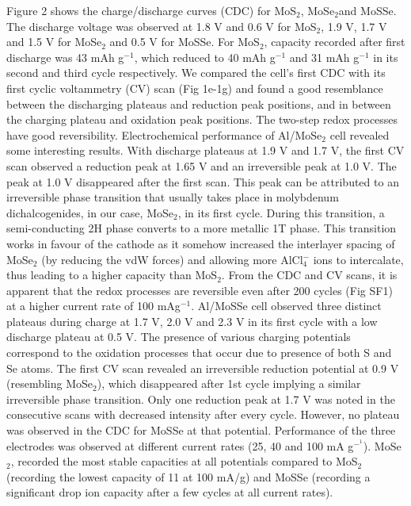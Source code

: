 \documentclass[num-refs]{wiley-article}
\begin{document}
Figure 2 shows the charge/discharge curves (CDC) for MoS$_2$, MoSe$_2$and MoSSe. The discharge voltage was observed at 1.8 V and 0.6 V  for MoS$_2$, 1.9 V, 1.7 V  and 1.5 V for MoSe$_2$ and 0.5 V for MoSSe. For MoS$_2$, capacity recorded after first discharge was 43 mAh g$^{-1}$, which reduced to 40 mAh g$^{-1}$ and 31 mAh g$^{-1}$ in its second and third cycle respectively. We compared the cell's first CDC with its first cyclic voltammetry (CV) scan (Fig 1e-1g) and found a good resemblance between the discharging plateaus and reduction peak positions, and in between the charging plateau and oxidation peak positions. The two-step redox processes have good reversibility. Electrochemical performance of Al/MoSe$_2$ cell revealed some interesting results. With discharge plateaus at 1.9 V and 1.7 V, the first CV scan observed a reduction peak at 1.65 V and an irreversible peak at 1.0 V. The peak at 1.0 V disappeared after the first scan. This peak can be attributed to an irreversible phase transition that usually takes place in molybdenum dichalcogenides, in our case, MoSe$_2$, in its first cycle\cite{fan_hybrid_2017}. During this transition, a semi-conducting 2H phase converts to a more metallic 1T phase.  This transition works in favour of the cathode as it somehow increased the interlayer spacing of MoSe$_2$ (by reducing the vdW forces) and allowing more AlCl$_4^-$ ions to intercalate, thus leading to a higher capacity than MoS$_2$. From the CDC and CV scans, it is apparent that the redox processes are reversible even after 200 cycles (Fig SF1) at a higher current rate of 100 mAg$^{-1}$. Al/MoSSe cell observed three distinct plateaus during charge at 1.7 V, 2.0 V and 2.3 V in its first cycle with a low discharge plateau at 0.5 V. The presence of various charging potentials correspond to the oxidation processes that occur due to presence of both S and Se atoms. The first CV scan revealed an irreversible  reduction potential at 0.9 V (resembling MoSe$_2$), which disappeared after 1st cycle implying a similar irreversible phase transition. Only one reduction peak at 1.7 V was noted in the consecutive scans with decreased intensity after every cycle. However, no plateau was observed in the CDC for MoSSe at that potential. Performance of the three electrodes was observed at different current rates (25, 40 and 100 mA g$^-^1$). MoSe$_2$, recorded the most stable capacities at all potentials compared to MoS$_2$ (recording the lowest capacity of 11 at 100 mA/g) and MoSSe (recording a significant drop ion capacity after a few cycles at all current rates). 
\end{document}
